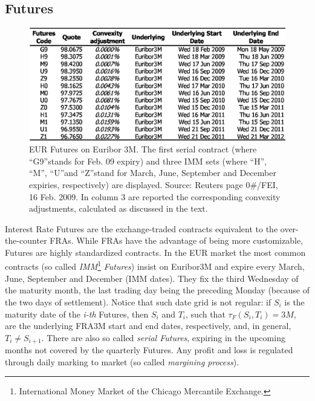 \documentclass[11pt,reqno]{amsart}
\begin{document}
\subsection{Futures}
\label{sec:Futures}
\begin{figure}[tbp]
\centering
\includegraphics[scale=0.9]{./FigMktFut3M}
\caption{EUR Futures on Euribor 3M. The first serial contract (where \textquotedblleft G9\textquotedblright stands for Feb. 09 expiry) and three IMM sets (where \textquotedblleft H\textquotedblright, \textquotedblleft M\textquotedblright, \textquotedblleft U\textquotedblright and \textquotedblleft Z\textquotedblright stand for March, June, September and December expiries, respectively) are displayed. Source: Reuters page 0\#/FEI, 16 Feb. 2009. In column 3 are reported the corresponding convexity adjustments, calculated as discussed in the text.}
\label{fig:Futures3M}
\end{figure}
Interest Rate Futures are the exchange-traded contracts equivalent to the over-the-counter FRAs. While FRAs have the advantage of being more customizable, Futures are highly standardized contracts. In the EUR market the most common contracts (so called \emph{IMM}\footnote{International Money Market of the Chicago Mercantile Exchange.} \emph{Futures}) insist on Euribor3M and expire every March, June, September and December (IMM dates). They fix the third Wednesday of the maturity month, the last trading day being the preceding Monday (because of the two days of settlement). Notice that  such date grid is not regular: if $S_i$ is the maturity date of the \textit{i-th} Futures, then $S_i$ and $T_i$, such that $\tau_F\left(S_i,T_i\right)=3M$, are the underlying FRA3M start and end dates, respectively, and, in general, $T_i\neq S_{i+1}$.
There are also so called \emph{serial Futures}, expiring in the upcoming months not covered by the quarterly Futures. Any profit and loss is regulated through daily marking to market (so called \emph{margining process}).
\par
\end{document}
